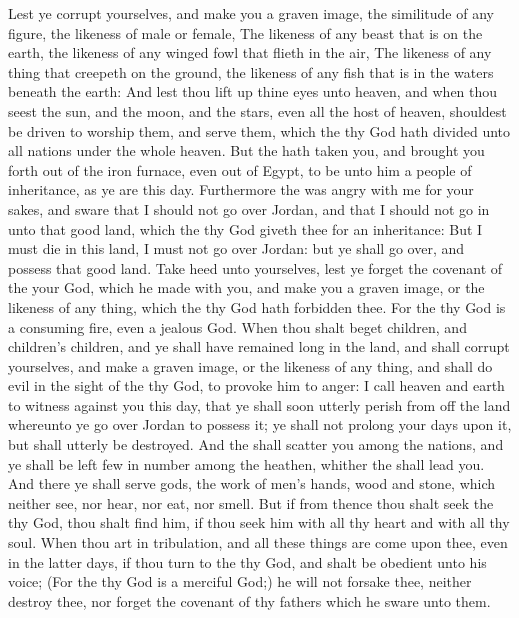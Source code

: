 \begin{biblechapter}
\verse Lest ye corrupt yourselves, and make you a graven image, the similitude of any figure, the likeness of male or female,
\verse The likeness of any beast that is on the earth, the likeness of any winged fowl that flieth in the air,
\verse The likeness of any thing that creepeth on the ground, the likeness of any fish that is in the waters beneath the earth:
\verse And lest thou lift up thine eyes unto heaven, and when thou seest the sun, and the moon, and the stars, even all the host of heaven, shouldest be driven to worship them, and serve them, which the \LORD thy God hath divided unto all nations under the whole heaven.
\verse But the \LORD hath taken you, and brought you forth out of the iron furnace, even out of Egypt, to be unto him a people of inheritance, as ye are this day.
\verse Furthermore the \LORD was angry with me for your sakes, and sware that I should not go over Jordan, and that I should not go in unto that good land, which the \LORD thy God giveth thee for an inheritance:
\verse But I must die in this land, I must not go over Jordan: but ye shall go over, and possess that good land.
\verse Take heed unto yourselves, lest ye forget the covenant of the \LORD your God, which he made with you, and make you a graven image, or the likeness of any thing, which the \LORD thy God hath forbidden thee.
\verse For the \LORD thy God is a consuming fire, even a jealous God.
\verse When thou shalt beget children, and children's children, and ye shall have remained long in the land, and shall corrupt yourselves, and make a graven image, or the likeness of any thing, and shall do evil in the sight of the \LORD thy God, to provoke him to anger:
\verse I call heaven and earth to witness against you this day, that ye shall soon utterly perish from off the land whereunto ye go over Jordan to possess it; ye shall not prolong your days upon it, but shall utterly be destroyed.
\verse And the \LORD shall scatter you among the nations, and ye shall be left few in number among the heathen, whither the \LORD shall lead you.
\verse And there ye shall serve gods, the work of men's hands, wood and stone, which neither see, nor hear, nor eat, nor smell.
\verse But if from thence thou shalt seek the \LORD thy God, thou shalt find him, if thou seek him with all thy heart and with all thy soul.
\verse When thou art in tribulation, and all these things are come upon thee, even in the latter days, if thou turn to the \LORD thy God, and shalt be obedient unto his voice;
\verse (For the \LORD thy God is a merciful God;) he will not forsake thee, neither destroy thee, nor forget the covenant of thy fathers which he sware unto them.

\end{biblechapter}
